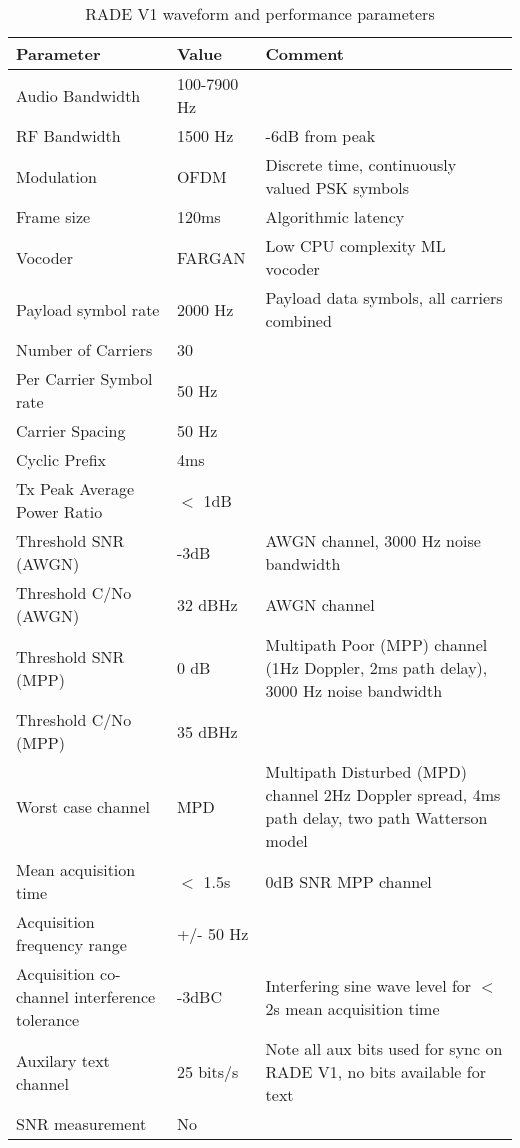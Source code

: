 \documentclass{article}
\begin{document}
\begin{table} [H]
\centering
\begin{tabular}{m{5cm} | m{3cm} | m{5cm} }
 \hline
 Parameter & Value & Comment \\
 \hline
 Audio Bandwidth & 100-7900 Hz \\
 RF Bandwidth & 1500 Hz & -6dB from peak \\
 Modulation & OFDM & Discrete time, continuously valued PSK symbols \\
 Frame size & 120ms & Algorithmic latency \\
 Vocoder & FARGAN & Low CPU complexity ML vocoder \\
 Payload symbol rate & 2000 Hz & Payload data symbols, all carriers combined \\
 Number of Carriers & 30 \\
 Per Carrier Symbol rate & 50 Hz \\
 Carrier Spacing & 50 Hz \\
 Cyclic Prefix & 4ms \\
 Tx Peak Average Power Ratio & $<$ 1dB \\
 Threshold SNR (AWGN) & -3dB & AWGN channel, 3000 Hz noise bandwidth \\
 Threshold C/No (AWGN) & 32 dBHz & AWGN channel \\
 Threshold SNR (MPP) & 0 dB & Multipath Poor (MPP) channel (1Hz Doppler, 2ms path delay), 3000 Hz noise bandwidth \\
 Threshold C/No  (MPP) & 35 dBHz  \\
  Worst case channel & MPD & Multipath Disturbed (MPD) channel 2Hz Doppler spread, 4ms path delay, two path Watterson model \\
 Mean acquisition time & $<$ 1.5s & 0dB SNR MPP channel \\
 Acquisition frequency range & +/- 50 Hz \\
 Acquisition co-channel interference tolerance & -3dBC & Interfering sine wave level for $<$ 2s mean acquisition time \\
 Auxilary text channel & 25 bits/s & Note all aux bits used for sync on RADE V1, no bits available for text \\
 SNR measurement & No \\
\hline
\end{tabular}
\caption{RADE V1 waveform and performance parameters}
\label{tab:constant_eb}
\end{table}
\end{document}
